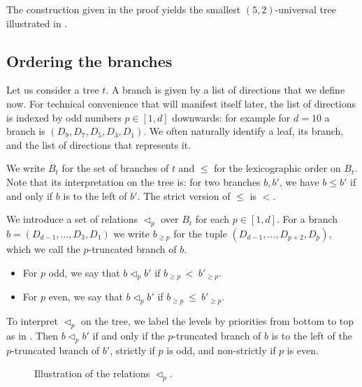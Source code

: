 \noindent The construction given in the proof yields the smallest $(5,2)$-universal tree illustrated in .

\subsection*{Ordering the branches}
Let us consider a tree $t$.
A branch is given by a list of directions that we define now.
For technical convenience that will manifest itself later, the list of directions is indexed by odd numbers $p \in [1,d]$ downwards:
for example for $d = 10$ a branch is $(D_9,D_7,D_5,D_3,D_1)$.
We often naturally identify a leaf, its branch, and the list of directions that represents it.

We write $B_t$ for the set of branches of $t$ and $\le$ for the lexicographic order on $B_t$.
Note that its interpretation on the tree is: for two branches $b,b'$, we have $b \le b'$ if and only if $b$ is to the left of $b'$.
The strict version of $\le$ is $<$.

We introduce a set of relations $\vartriangleleft_p$ over $B_t$ for each $p \in [1,d]$.
For a branch $b = (D_{d-1},\dots,D_3,D_1)$ we write $b_{\ge p}$ for the tuple $(D_{d-1},\dots,D_{p+2},D_p)$,
which we call the $p$-truncated branch of $b$.
\begin{itemize}
	\item For $p$ odd, we say that $b \vartriangleleft_p b'$ 
	if $b_{\ge p}\ <\ b'_{\ge p}$.
	\item For $p$ even, we say that $b \vartriangleleft_p b'$ 
	if $b_{\ge p}\ \le\ b'_{\ge p}$.
\end{itemize}

To interpret $\vartriangleleft_p$ on the tree, we label the levels by priorities from bottom to top as in .
Then $b \vartriangleleft_p b'$ if and only if the $p$-truncated branch of $b$ is to the left of the $p$-truncated branch of $b'$,
strictly if $p$ is odd, and non-strictly if $p$ is even.

\begin{figure*}[!ht]
\centering
{}
\caption{Illustration of the relations $\vartriangleleft_p$.}
\label{3-fig:example_relations}
\end{figure*}

